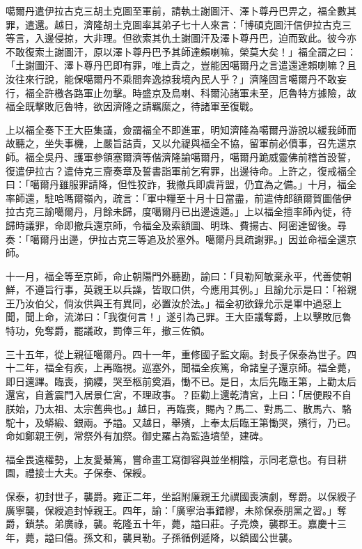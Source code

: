 \begin{pinyinscope}
噶爾丹遣伊拉古克三胡土克圖至軍前，請執土謝圖汗、澤卜尊丹巴畀之，福全數其罪，遣還。越日，濟隆胡土克圖率其弟子七十人來言：「博碩克圖汗信伊拉古克三等言，入邊侵掠，大非理。但欲索其仇土謝圖汗及澤卜尊丹巴，迫而致此。彼今亦不敢復索土謝圖汗，原以澤卜尊丹巴予其師達賴喇嘛，榮莫大矣！」福全謂之曰：「土謝圖汗、澤卜尊丹巴即有罪，唯上責之，豈能因噶爾丹之言遣還達賴喇嘛？且汝往來行說，能保噶爾丹不乘間奔逸掠我境內民人乎？」濟隆固言噶爾丹不敢妄行，福全許檄各路軍止勿擊。時盛京及烏喇、科爾沁諸軍未至，厄魯特方據險，故福全既擊敗厄魯特，欲因濟隆之請羈縻之，待諸軍至復戰。

上以福全奏下王大臣集議，僉謂福全不即進軍，明知濟隆為噶爾丹游說以緩我師而故聽之，坐失事機，上嚴旨詰責，又以允禔與福全不協，留軍前必僨事，召先還京師。福全吳丹、護軍參領塞爾濟等偕濟隆諭噶爾丹，噶爾丹跪威靈佛前稽首設誓，復遣伊拉古？遣侍克三齎奏章及誓書詣軍前乞宥罪，出邊待命。上許之，復戒福全曰：「噶爾丹雖服罪請降，但性狡詐，我撤兵即虞背盟，仍宜為之備。」十月，福全率師還，駐哈嗎爾嶺內，疏言：「軍中糧至十月十日當盡，前遣侍郎額爾賀圖偕伊拉古克三諭噶爾丹，月餘未歸，度噶爾丹已出邊遠遁。」上以福全擅率師內徙，待歸時議罪，命即撤兵還京師，令福全及索額圖、明珠、費揚古、阿密達留後。尋奏：「噶爾丹出邊，伊拉古克三等追及於塞外。噶爾丹具疏謝罪。」因並命福全還京師。

十一月，福全等至京師，命止朝陽門外聽勘，諭曰：「貝勒阿敏棄永平，代善使朝鮮，不遵旨行事，英親王以兵譟，皆取口供，今應用其例。」且諭允示是曰：「裕親王乃汝伯父，倘汝供與王有異同，必置汝於法。」福全初欲錄允示是軍中過惡上聞，聞上命，流涕曰：「我復何言！」遂引為己罪。王大臣議奪爵，上以擊敗厄魯特功，免奪爵，罷議政，罰俸三年，撤三佐領。

三十五年，從上親征噶爾丹。四十一年，重修國子監文廟。封長子保泰為世子。四十二年，福全有疾，上再臨視。巡塞外，聞福全疾篤，命諸皇子還京師。福全薨，即日還蹕。臨喪，摘纓，哭至柩前奠酒，慟不已。是日，太后先臨王第，上勸太后還宮，自蒼震門入居景仁宮，不理政事。？臣勸上還乾清宮，上曰：「居便殿不自朕始，乃太祖、太宗舊典也。」越日，再臨喪，賜內？馬二、對馬二、散馬六、駱駝十，及蟒緞、銀兩。予謚。又越日，舉殯，上奉太后臨王第慟哭，殯行，乃已。命如鄭親王例，常祭外有加祭。御史羅占為監造墳塋，建碑。

福全畏遠權勢，上友愛綦篤，嘗命畫工寫御容與並坐桐陰，示同老意也。有目耕園，禮接士大夫。子保泰、保綬。

保泰，初封世子，襲爵。雍正二年，坐諂附廉親王允禩國喪演劇，奪爵。以保綬子廣寧襲，保綬追封悼親王。四年，諭：「廣寧治事錯繆，未除保泰朋黨之習。」奪爵，鎖禁。弟廣祿，襲。乾隆五十年，薨，謚曰莊。子亮煥，襲郡王。嘉慶十三年，薨，謚曰僖。孫文和，襲貝勒。子孫循例遞降，以鎮國公世襲。


\end{pinyinscope}
